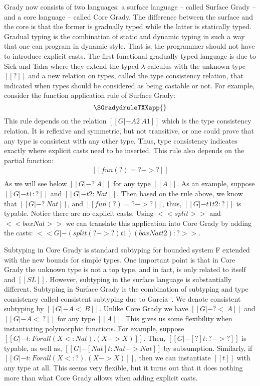 Grady now consists of two languages: a surface language -- called
Surface Grady -- and a core language -- called Core Grady. The
difference between the surface and the core is that the former is
gradually typed while the latter is statically typed. Gradual typing
is the combination of static and dynamic typing in such a way that one
can program in dynamic style.  That is, the programmer should not have
to introduce explicit casts. The first functional gradually typed
language is due to Siek and Taha \cite{Siek:2006} where they extend
the typed $\lambda$-calculus with the unknown type $[[?]]$ and a new
relation on types, called the type consistency relation, that indicated
when types should be considered as being castable or not.  For
example, consider the function application rule of Surface Grady:
\[
\SGradydruleTXXapp{}
\]
This rule depends on the relation $[[G |- A2 ~ A1]]$ which is the type
consistency relation.  It is reflexive and symmetric, but not
transitive, or one could prove that any type is consistent with any
other type.  Thus, type consistency indicates exactly where explicit
casts need to be inserted.  This rule also depends on the partial
function:
\[
\begin{array}{lll}
  [[fun(?) = ? -> ?]]\\
  [[fun(A1 -> B1) = A1 -> B1]]
\end{array}
\]
As we will see below $[[G |- ? ~ A]]$ for any type $[[A]]$.  As an
example, suppose $[[G |- t1 : ?]]$ and $[[G |- t2 : Nat]]$.  Then
based on the rule above, we know that $[[G |- ? ~ Nat]]$, and
$[[fun(?) = ? -> ?]]$, thus, $[[G |- t1 t2 : ?]]$ is typable.  Notice
there are no explicit casts.  Using $<<split>>$ and $<<box Nat>>$ we
can translate this application into Core Grady by adding the casts:
$<<G |- (split (? -> ?) t1) (box Nat t2) : ?>>$.

Subtyping in Core Grady is standard subtyping for bounded system F
extended with the new bounds for simple types.  One important point is
that in Core Grady the unknown type is not a top type, and in fact, is
only related to itself and $[[SL]]$.  However, subtyping in the
surface language is substantially different.  Subtyping in Surface
Grady is the combination of subtyping and type consistency called
consistent subtyping due to Garcia~\cite{Garcia:2016}.  We denote
consistent subtyping by $[[G |- A <~ B]]$.  Unlike Core Grady we have
$[[G |- ? <~ A]]$ and $[[G |- A <~ ?]]$ for any type $[[A]]$.  This
gives us some flexibility when instantiating polymorphic functions.
For example, suppose $[[G |- t : Forall (X <: Nat).(X -> X)]]$.  Then,
$[[G |- [?]t : ? -> ?]]$ is typable, as well as, $[[G |- [Nat]t : Nat
    -> Nat]]$ by subsumption.  Similarly, if $[[G |- t : Forall (X <:
    ?).(X -> X)]]$, then we can instantiate $[[t]]$ with any type at
all.  This seems very flexible, but it turns out that it does nothing
more than what Core Grady allows when adding explicit casts.

